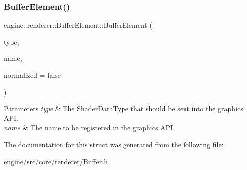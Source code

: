 \subsubsection{\texorpdfstring{Buffer\+Element()}{BufferElement()}}
{\footnotesize\ttfamily engine\+::renderer\+::\+Buffer\+Element\+::\+Buffer\+Element (\begin{DoxyParamCaption}\item[{\hyperlink{Buffer_8h_a8d90f87a6e9335927edd305c1e1345c1}{Shader\+Data\+Type}}]{type,  }\item[{const std\+::string \&}]{name,  }\item[{bool}]{normalized = {\ttfamily false} }\end{DoxyParamCaption})\hspace{0.3cm}{\ttfamily [inline]}}


\begin{DoxyParams}{Parameters}
{\em type} & The Shader\+Data\+Type that should be sent into the graphics A\+PI. \\
\hline
{\em name} & The name to be registered in the graphics A\+PI. \\
\hline
\end{DoxyParams}


The documentation for this struct was generated from the following file\+:\begin{DoxyCompactItemize}
\item 
engine/src/core/renderer/\hyperlink{Buffer_8h}{Buffer.\+h}\end{DoxyCompactItemize}
